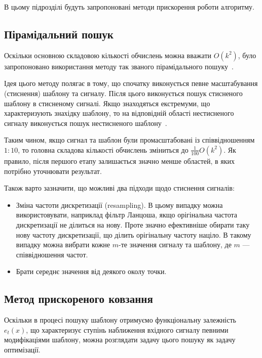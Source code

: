     В цьому підрозділі будуть запропоновані методи прискорення роботи алгоритму.

    \subsection{Пірамідальний пошук}
        Оскільки основною складовою кількості обчислень можна вважати $O(k^2)$, було запропоновано використання методу
        так званого пірамідального пошуку~\cite{book1}\cite{mine}.

        Ідея цього методу полягає в тому, що спочатку виконується певне масштабування (стиснення) шаблону та сигналу.
        Після цього виконується пошук стисненого шаблону в стисненому сигналі.
        Якщо знаходяться екстремуми, що характеризують знахідку шаблону, то на відповідній області нестисненого
        сигналу виконується пошук нестисненого шаблону~\cite{book2}.

        Таким чином, якщо сигнал та шаблон були промасштабовані із співвідношенням $1:10$, то головна складова
        кількості обчислень зміниться до $\frac{1}{100} O(k^2)$.
        Як правило, після першого етапу залишається значно менше областей, в яких потрібно уточнювати результат.

        Також варто зазначити, що можливі два підходи щодо стиснення сигналів:
        \begin{itemize}
            \item Зміна частоти дискретизації (resampling).
                В цьому випадку можна використовувати, наприклад фільтр Ланцоша, якщо орігінальна частота
                дискретизації не ділиться на нову.
                Проте значно ефективніше обирати таку нову частоту дискретизації, що ділить орігінальну частоту
                націло.
                В такому випадку можна вибрати кожне $m$-те значення сигналу та шаблону, де $m$ --- співвідношення
                частот.~\cite{book3}
            \item Брати середнє значення від деякого околу точки.
        \end{itemize}
    \subsection{Метод прискореного ковзання}
        Оскільки в процесі пошуку шаблону отримуємо функціональну залежність $e_t(x)$, що характеризує ступінь
        наближення вхідного сигналу певними модифікаціями шаблону, можна розглядати задачу цього пошуку як задачу
        оптимізації.

